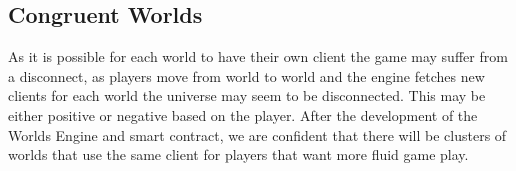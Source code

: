 \documentclass[runningheads,a4paper]{llncs}
\begin{document}
\subsection{Congruent Worlds}
As it is possible for each world to have their own client the game may suffer from a disconnect, as players move from world to world and the engine fetches new clients for each world the universe may seem to be disconnected. This may be either positive or negative based on the player. After the development of the Worlds Engine and smart contract, we are confident that there will be clusters of worlds that use the same client for players that want more fluid game play.
\end{document}
